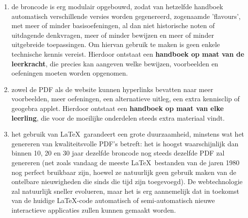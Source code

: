 \documentclass{ximera}
\begin{document}
\begin{enumerate}
        \item de broncode is erg modulair opgebouwd, zodat van hetzelfde handboek automatisch verschillende versies worden gegenereerd, zogenaamde 'flavours', met meer of minder basisoefeningen, al dan niet historische noten of uitdagende denkvragen, meer of minder bewijzen en meer of minder uitgebreide toepassingen. Om hiervan gebruik te maken is geen enkele technische kennis vereist. Hierdoor ontstaat een \textbf{handboek op maat van de leerkracht}, die precies kan aangeven welke bewijzen, voorbeelden en oefeningen moeten worden opgenomen.
        \item zowel de PDF als de website kunnen hyperlinks bevatten naar meer voorbeelden, meer oefeningen, een alternatieve uitleg, een extra kennisclip of geogebra applet. Hierdoor ontstaat een \textbf{handboek op maat van elke leerling}, die voor de moeilijke onderdelen steeds extra materiaal vindt.
        \item het gebruik van \LaTeX\ garandeert een grote duurzaamheid, minstens wat het genereren van kwaliteitsvolle PDF's betreft: het is hoogst waarschijnlijk dan binnen 10, 20 en 30 jaar dezelfde broncode nog steeds dezelfde PDF zal genereren (net zoals vandaag de meeste \LaTeX\ bestanden van de jaren 1980 nog perfect bruikbaar zijn, hoewel ze natuurlijk geen gebruik maken van de ontelbare nieuwigheden die sinds die tijd zijn toegevoegd). De webtechnologie zal natuurlijk sneller evolueren, maar het is erg aannemelijk dat in toekomst van de huidige \LaTeX-code automatisch of semi-automatisch nieuwe interactieve applicaties zullen kunnen gemaakt worden.
    \end{enumerate}
\end{document}
